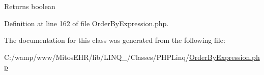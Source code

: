 \begin{DoxyReturn}{\-Returns}
boolean 
\end{DoxyReturn}


\-Definition at line 162 of file \-Order\-By\-Expression.\-php.




\-The documentation for this class was generated from the following file\-:\begin{DoxyCompactItemize}
\item 
\-C\-:/wamp/www/\-Mitos\-E\-H\-R/lib/\-L\-I\-N\-Q\-\_/\-Classes/\-P\-H\-P\-Linq/\hyperlink{_order_by_expression_8php}{\-Order\-By\-Expression.\-php}\end{DoxyCompactItemize}
